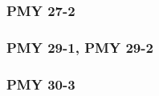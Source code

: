 \documentclass[12pt, a4paper,titlepage]{article}
\begin{document}
{\subsubsection*{PMY 27-2}

\subsubsection*{PMY 29-1, PMY 29-2}

\subsubsection*{PMY 30-3}



}
\end{document}
